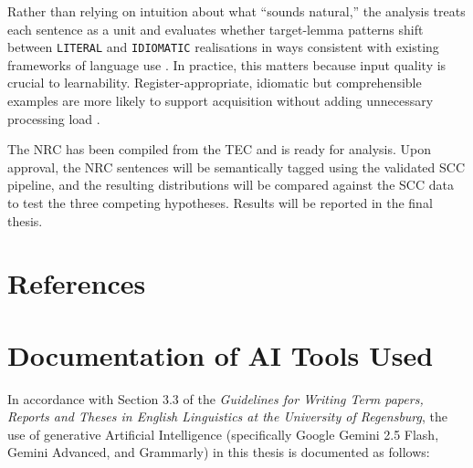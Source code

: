 Rather than relying on intuition about what ``sounds natural,'' the analysis treats each sentence as a unit and evaluates whether target-lemma patterns shift between \texttt{LITERAL} and \texttt{IDIOMATIC} realisations in ways consistent with existing frameworks of language use \parencite{sinclairCorpusConcordanceCollocation1991}. In practice, this matters because input quality is crucial to learnability. Register-appropriate, idiomatic but comprehensible examples are more likely to support acquisition without adding unnecessary processing load \parencite{krashenInputHypothesisIssues1985,swellerCognitiveLoadProblem1988a}.

The NRC has been compiled from the TEC and is ready for analysis. Upon approval, the NRC sentences will be semantically tagged using the validated SCC pipeline, and the resulting distributions will be compared against the SCC data to test the three competing hypotheses. Results will be reported in the final thesis.

\newpage
\section*{References}
\printbibliography[heading=none]

\newpage
\section*{Documentation of AI Tools Used}

In accordance with Section 3.3 of the \textit{Guidelines for Writing Term papers, Reports and Theses in English Linguistics at the University of Regensburg}, the use of generative Artificial Intelligence (specifically Google Gemini 2.5 Flash, Gemini Advanced, and Grammarly) in this thesis is documented as follows:

